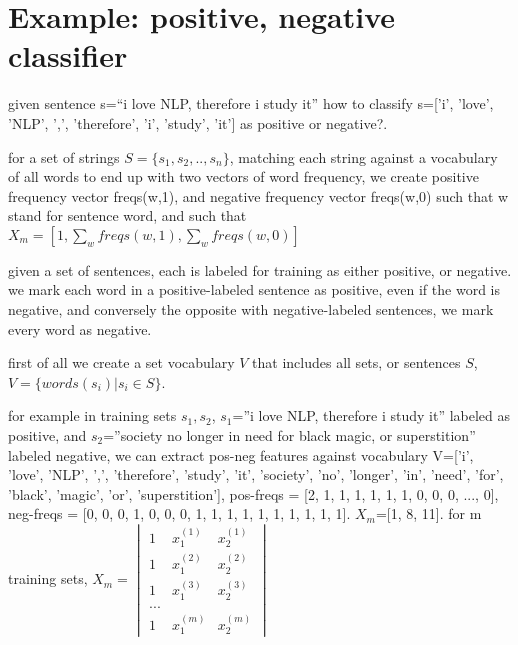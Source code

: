 \documentclass[4apaper,12pt]{book}
\begin{document}
\section{Example: positive, negative classifier}
\begin{description}
\item given sentence s=``i love NLP, therefore i study it'' how to classify s=['i', 'love', 'NLP', ',', 'therefore', 'i', 'study', 'it']  as positive or negative?.
\item for a set of strings $S=\{s_1, s_2, .., s_n\}$, matching each string against a vocabulary of all words to end up with two vectors of word frequency, we create positive frequency vector freqs(w,1), and negative frequency vector freqs(w,0) such that w stand for sentence word, and such that $X_m=[1, \sum_{w}freqs(w,1), \sum_{w}freqs(w,0)]$
\item given a set of sentences, each is labeled for training as either positive, or negative. we mark each word in a positive-labeled sentence as positive, even if the word is negative, and conversely the opposite with negative-labeled sentences, we mark every word as negative.
\item first of all we create a set vocabulary $V$ that includes all sets, or sentences $S$, $V=\{words(s_i) | s_i \in{S}\}$.
\item for example in training sets ${s_1, s_2}$, $s_1$=''i love NLP, therefore i study it'' labeled as positive, and $s_2$=''society no longer in need for black magic, or superstition'' labeled negative, we can extract pos-neg features against vocabulary V=['i', 'love', 'NLP', ',', 'therefore', 'study', 'it', 'society', 'no', 'longer', 'in', 'need', 'for', 'black', 'magic', 'or', 'superstition'], pos-freqs = [2, 1, 1, 1, 1, 1, 1, 0, 0, 0, ..., 0], neg-freqs = [0, 0, 0, 1, 0, 0, 0, 1, 1, 1, 1, 1, 1, 1, 1, 1, 1]. $X_m$=[1, 8, 11]. for m training sets, $X_{m}=\begin{vmatrix}1&x_1^{(1)}&x_2^{(1)}\\1&x_1^{(2)}&x_2^{(2)}\\1&x_1^{(3)}&x_2^{(3)}\\...\\1&x_1^{(m)}&x_2^{(m)}\end{vmatrix}$
  \end{description}
\end{document}

